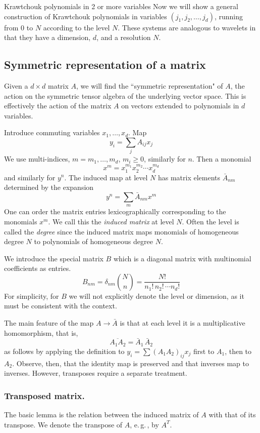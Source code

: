 \documentclass[runningheads]{llncs}
\begin{document}
\begin{section}{Krawtchouk polynomials in 2 or more variables}
Now we will show a general construction of Krawtchouk polynomials in variables $(j_1,j_2,\ldots,j_d)$, running
from $0$ to $N$ according to the level $N$. These systems are analogous to wavelets in that they have a dimension, $d$,
and a resolution $N$.
\subsection{Symmetric representation of a matrix}
Given a $d\times d$ matrix $A$, we will find the ``symmetric representation" of $A$, the action on
the symmetric tensor algebra of the underlying vector space. This is effectively the action 
of the matrix $A$ on vectors extended to polynomials in $d$ variables. 

Introduce commuting variables $x_1,\ldots,x_d$. Map
$$y_i=\sum_{j}A_{ij}x_j$$
We use multi-indices,
$m=m_1,\ldots,m_d$, $m_i\ge0$, similarly for $n$. Then a monomial
$$x^m=x_1^{m_1}x_2^{m_2}\cdots x_d^{m_d}$$
and similarly for $y^n$. The induced map at level $N$ has matrix elements $\bar A_{nm}$ determined by the expansion
$$ y^n=\sum_{m} \bar A_{nm}x^m$$
One can order the matrix entries lexicographically corresponding to the monomials $x^m$.
We call this the \textsl{induced matrix} at level $N$. Often the level is called the \textsl{degree} since
the induced matrix maps monomials of homogeneous degree $N$ to polynomials of homogeneous degree $N$.

We introduce the special matrix $B$ which is a diagonal matrix with multinomial coefficients as entries.
$$B_{nm}=\delta_{nm}\binom{N}{n}=\frac{N!}{n_1!\,n_2!\,\cdots n_d!}$$
For simplicity, for $B$ we will not explicitly denote the level or dimension, as it must be consistent with the context.

The main feature of the map $A\to \bar A$ is that at each level it is a multiplicative homomorphism, that is,
$$\overline{A_1A_2}=\bar A_1\,\bar A_2$$
as follows by applying the definition to $y_i=\sum (A_1A_2)_{ij}x_j$ first to $A_1$, then to $A_2$. Observe, then, that the identity map is preserved
and that inverses map to inverses. However, transposes require a separate treatment.

\subsubsection{Transposed matrix. }
The basic lemma is the relation between the induced matrix of $A$ with that of its transpose.
We denote the transpose of $A$, e.\,g.\,, by $A^T$. 


\end{section}
\end{document}
